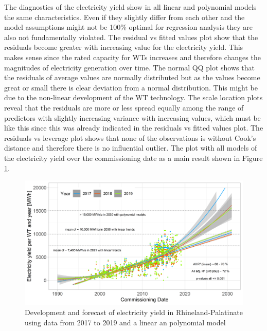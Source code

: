 \documentclass[a4paper,11pt]{article}
\begin{document}
The diagnostics of the electricity yield show in all linear and polynomial models the same characteristics. Even if they slightly differ from each other and the model assumptions might not be 100\% optimal for regression analysis they are also not fundamentally violated. The residual vs fitted values plot show that the residuals become greater with increasing value for the electricity yield. This makes sense since the rated capacity for WTs increases and therefore changes the magnitudes of electricity generation over time. The normal QQ plot shows that the residuals of average values are normally distributed but as the values become great or small there is clear deviation from a normal distribution. This might be due to the non-linear development of the WT technology. The scale location plots reveal that the residuals are more or less spread equally among the range of predictors with slightly increasing variance with increasing values, which must be like this since this was already indicated in the residuals vs fitted values plot. The residuals vs leverage plot shows that none of the observations is without Cook's distance and therefore there is no influential outlier. The plot with all models of the electricity yield over the commissioning date as a main result shown in Figure \ref{fig:electricityyield}.
\begin{figure}

{\centering \includegraphics[width=1\linewidth]{data/Amprion/results_of_analysis/electricity_yield_2017-2019} 

}

\caption{Development and forecast of electricity yield in Rhineland-Palatinate using data from 2017 to 2019 and a linear an polynomial model}\label{fig:electricityyield}
\end{figure}
\end{document}
